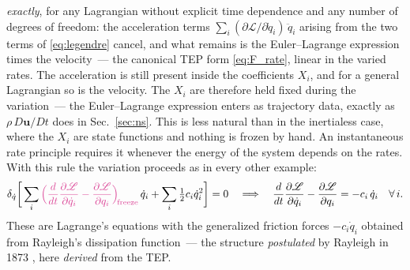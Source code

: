 \documentclass[aip,pof,reprint,amsmath,amssymb,longbibliography]{revtex4-2}
\begin{document}
\textit{exactly}, for any Lagrangian without explicit time dependence and any number of degrees of freedom: the acceleration terms $\sum_i (\partial \mathscr{L}/\partial \dot{q}_i)\, \ddot{q}_i$ arising from the two terms of \eqref{eq:legendre} cancel, and what remains is the Euler--Lagrange expression times the velocity~--- the canonical TEP form \eqref{eq:F_rate}, linear in the varied rates. The acceleration is still present inside the coefficients $X_i$, and for a general Lagrangian so is the velocity. The $X_i$ are therefore held fixed during the variation~--- the Euler--Lagrange expression enters as trajectory data, exactly as $\rho\, D\boldsymbol{u}/Dt$ does in Sec.~\ref{sec:ns}. This is less natural than in the inertialess case, where the $X_i$ are state functions and nothing is frozen by hand. An instantaneous rate principle requires it whenever the energy of the system depends on the rates. With this rule the variation proceeds as in every other example:
\begin{align}
    \delta_{\dot{q}} \bigg[ \sum_i \textcolor{freezepink}{\Big( \frac{d}{dt}\frac{\partial \mathscr{L}}{\partial \dot{q}_i} - \frac{\partial \mathscr{L}}{\partial q_i} \Big)_{\!\text{freeze}}}\, \dot{q}_i + \sum_i \tfrac{1}{2} c_i \dot{q}_i^2 \bigg] = 0
    \quad \Longrightarrow \quad
    \frac{d}{dt} \frac{\partial \mathscr{L}}{\partial \dot{q}_i} - \frac{\partial \mathscr{L}}{\partial q_i}
    = -c_i\, \dot{q}_i \quad \forall\, i. \label{eq:lagrange_rayleigh}
\end{align}
These are Lagrange's equations with the generalized friction forces $-c_i\dot{q}_i$ obtained from Rayleigh's dissipation function~--- the structure \textit{postulated} by Rayleigh in 1873 \cite{rayleigh1873}, here \textit{derived} from the TEP.
\end{document}
